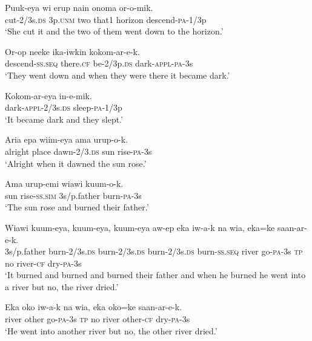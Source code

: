 \ea
\gll  Puuk-eya  wi  erup  nain  onoma  or-o-mik. \\
cut-2/3s.\textsc{ds}  3p.\textsc{unm}  two  that1  horizon  descend-\textsc{pa}-1/3p \\
\glt ‘She cut it and the two of them went down to the horizon.’ \\
\z


\ea
\gll  Or-op  neeke  ika-iwkin  kokom-ar-e-k. \\
descend-\textsc{ss.seq}  there.\textsc{cf}  be-2/3p.\textsc{ds}  dark-\textsc{appl}-\textsc{pa}-3s \\
\glt ‘They went down and when they were there it became dark.’ \\
\z


\ea
\gll  Kokom-ar-eya  in-e-mik. \\
dark-\textsc{appl}-2/3s.\textsc{ds}  sleep-\textsc{pa}-1/3p \\
\glt ‘It became dark and they slept.’ \\
\z


\ea
\gll  Aria  epa  wiim-eya  ama  urup-o-k. \\
alright  place  dawn-2/3.\textsc{ds}  sun  rise-\textsc{pa}-3s \\
\glt ‘Alright when it dawned the sun rose.’ \\
\z


\ea
\gll  Ama  urup-emi  wiawi  kuum-o-k. \\
sun  rise-\textsc{ss}.\textsc{sim}  3s/p.father  burn-\textsc{pa}-3s \\
\glt ‘The sun rose and burned their father.’ \\
\z


\ea
\gll  Wiawi  kuum-eya,  kuum-eya,  kuum-eya  aw-ep                  eka  iw-a-k  na  wia,  eka=ke  saan-ar-e-k. \\
3s/p.father  burn-2/3s.\textsc{ds}  burn-2/3s.\textsc{ds}  burn-2/3s.\textsc{ds}  burn-\textsc{ss.seq}  river  go-\textsc{pa}-3s  \textsc{tp}  no  river-\textsc{cf}  dry-\textsc{pa}-3s \\


\glt ‘It burned and burned and burned their father and when he burned he went into a river but no, the river dried.’ \\
\z


\ea
\gll  Eka  oko  iw-a-k  na  wia,  eka  oko=ke  saan-ar-e-k. \\
river  other  go-\textsc{pa}-3s  \textsc{tp}  no  river  other-\textsc{cf}  dry-\textsc{pa}-3s \\
\glt ‘He went into another river but no, the other river dried.’ \\
\z


